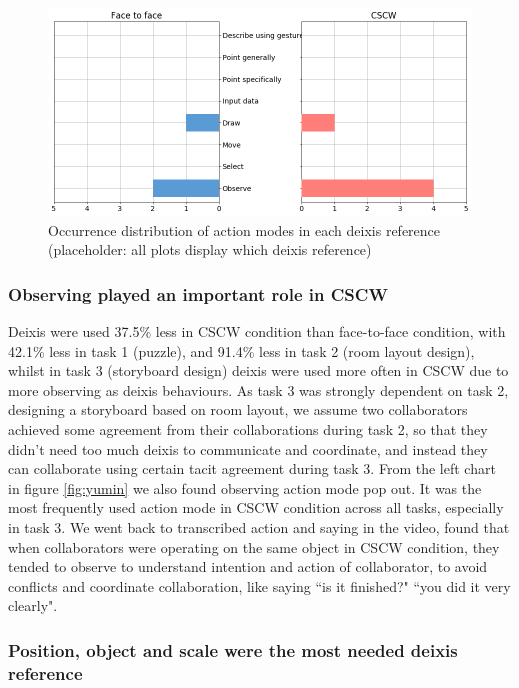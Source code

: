 \documentclass[12pt,twoside]{article}
\begin{document}
\begin{figure}
  \includegraphics[width=\linewidth]{img/Event.png}
  \vspace{3.7cm}
\endminipage\hfill
\caption{Occurrence distribution of action modes in each deixis reference (placeholder: all plots display which deixis reference)}\label{fig:jiayao}
\end{figure}

\subsubsection{Observing played an important role in CSCW}
Deixis were used 37.5\% less in CSCW condition than face-to-face condition, with 42.1\% less in task 1 (puzzle), and 91.4\% less in task 2 (room layout design), whilst in task 3 (storyboard design) deixis were used more often in CSCW due to more observing as deixis behaviours. As task 3 was strongly dependent on task 2, designing a storyboard based on room layout, we assume two collaborators achieved some agreement from their collaborations during task 2, so that they didn't need too much deixis to communicate and coordinate, and instead they can collaborate using certain tacit agreement during task 3. From the left chart in figure \ref{fig:yumin} we also found observing action mode pop out. It was the most frequently used action mode in CSCW condition across all tasks, especially in task 3. We went back to transcribed action and saying in the video, found that when collaborators were operating on the same object in CSCW condition, they tended to observe to understand intention and action of collaborator, to avoid conflicts and coordinate collaboration, like saying ``is it finished?" ``you did it very clearly".

\subsubsection{Position, object and scale were the most needed deixis reference}
\end{document}
